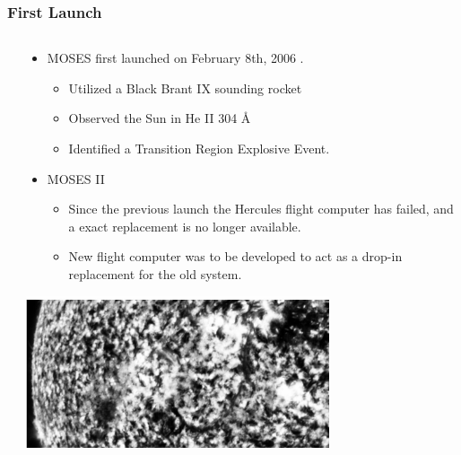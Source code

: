 \documentclass[landscape,xcolor={table},10pt]{beamer}
\begin{document}
	\begin{frame}
		
		\frametitle{First Launch}
		
		\begin{columns}[T] %
		\begin{column}{.15\textwidth}

			
		\end{column}%
		\hfill%
		\begin{column}{.83\textwidth}
		
			\begin{itemize}
				\item MOSES first launched on February 8th, 2006 \cite{moses}.
				\begin{itemize}
					\item Utilized a Black Brant IX sounding rocket
					\item Observed the Sun in He II 304 \AA
					\item Identified a Transition Region Explosive Event.
				\end{itemize}
				\item MOSES II
				\begin{itemize}
					\item Since the previous launch the Hercules flight computer has failed, and a exact replacement is no longer available.
					\item New flight computer was to be developed to act as a drop-in replacement for the old system.
					
				\end{itemize}
			\end{itemize}
			\includegraphics[width=0.7\textwidth]{images/exp2}
		\end{column}%
		\end{columns}
	
	\end{frame}
		
\end{document}
